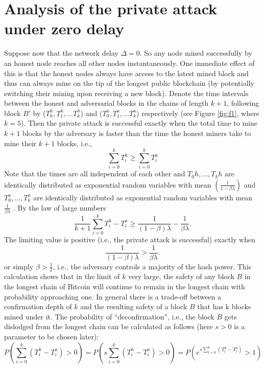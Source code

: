 \documentclass{report}
\begin{document}
\section{Analysis of the private attack under zero delay}
Suppose now that the network delay $\Delta = 0$. So any node mined successfully by an honest node reaches all other nodes instantaneously. One immediate eﬀect of this is that the honest nodes always have access to the latest mined block and thus can always mine on the tip of the longest public blockchain (by potentially switching their mining upon receiving a new block). Denote the time intervals between the honest and adversarial blocks in the chains of length $k + 1$, following block $B′$ by ($T_{0}^{h}, T_{1}^{h}, . . . T_{k}^{h}$) and ($T_{0}^{a}, T_{1}^{a}, . . . T_{k}^{a}$) respectively (see Figure \ref{fig:f1}, where $k = 5$). Then the private attack is successful exactly when the total time to mine $k + 1$ blocks by the adversary is faster than the time the honest miners take to mine their $k + 1$ blocks, i.e.,
\begin{equation*}
	\sum_{i=0}^{k} T_{i}^{h} \geq \sum_{i=0}^{k} T_{i}^{a}
\end{equation*}
Note that the times are all independent of each other and $T_{0}{h}, . . . , T_{k}{h}$ are identically distributed as exponential random variables with mean $(\frac{1}{1 - \beta\lambda})$ and $T_{0}^{a}, . . . , T_{k}^{a}$ are identically distributed as exponential random variables with mean $\frac{1}{\beta\lambda}$ . By the law of large numbers
\begin{equation*}
	\frac{1}{k + 1}\sum_{i=0}^{k} T_{i}^{h} - T_{i}^{a} \ge \frac{1}{(1 - \beta) \lambda} - \frac{1}{\beta\lambda}.
\end{equation*}
The limiting value is positive (i.e., the private attack is successful) exactly when
\begin{equation*}
	\frac{1}{(1 - \beta) \lambda} > \frac{1}{\beta\lambda}.
\end{equation*}
or simply $\beta > \frac{1}{2}$, i.e., the adversary controls a majority of the hash power. This calculation shows that in the limit of $k$ very large, the safety of any block $B$ in the longest chain of Bitcoin will continue to remain in the longest chain with probability approaching one. In general there is a trade-off between a confirmation depth of $k$ and the resulting safety of a block $B$ that has k blocks mined under it. The probability of “deconfirmation”, i.e., the block $B$ gets dislodged from the longest chain can be calculated as follows (here $s > 0$ is a parameter to be chosen later):
\begin{equation}
	P(\sum_{i=0}^{k}(T_{i}^{h} - T_{i}^{a}) > 0) = P(s\sum_{i=0}^{k}(T_{i}^{h} - T_{i}^{a}) > 0) = P(e^{s\sum_{t=0}^{k}(T_{i}^{h} - T_{i}^{a})} > 1)	
\end{equation}
\end{document}
